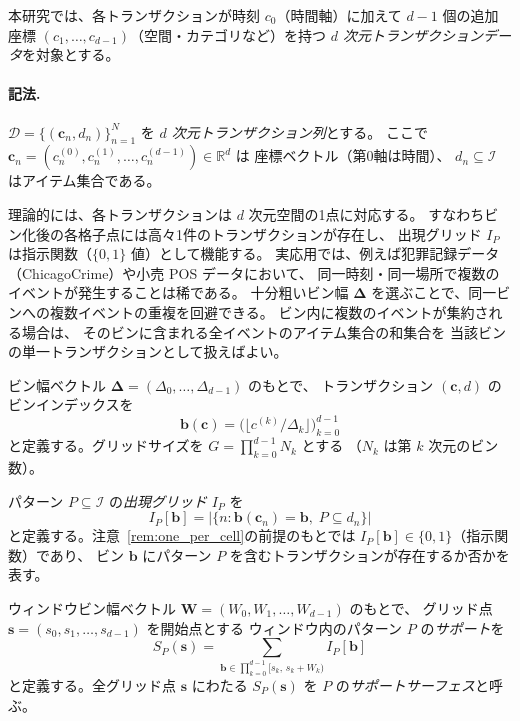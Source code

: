 本研究では、各トランザクションが時刻 $c_0$（時間軸）に加えて
$d-1$ 個の追加座標 $(c_1, \ldots, c_{d-1})$（空間・カテゴリなど）を持つ
\emph{$d$ 次元トランザクションデータ}を対象とする。

\paragraph{記法.}
$\mathcal{D} = \{(\bm{c}_n, d_n)\}_{n=1}^N$ を
\emph{$d$ 次元トランザクション列}とする。
ここで $\bm{c}_n = (c_n^{(0)}, c_n^{(1)}, \ldots, c_n^{(d-1)}) \in \mathbb{R}^d$ は
座標ベクトル（第0軸は時間）、
$d_n \subseteq \mathcal{I}$ はアイテム集合である。

\begin{remark}[データモデルの前提]\label{rem:one_per_cell}
理論的には、各トランザクションは $d$ 次元空間の1点に対応する。
すなわちビン化後の各格子点には高々1件のトランザクションが存在し、
出現グリッド $I_P$ は指示関数（$\{0,1\}$ 値）として機能する。
実応用では、例えば犯罪記録データ（ChicagoCrime）や小売 POS データにおいて、
同一時刻・同一場所で複数のイベントが発生することは稀である。
十分粗いビン幅 $\bm{\Delta}$ を選ぶことで、同一ビンへの複数イベントの重複を回避できる。
ビン内に複数のイベントが集約される場合は、
そのビンに含まれる全イベントのアイテム集合の和集合を
当該ビンの単一トランザクションとして扱えばよい。
\end{remark}

\begin{definition}[$d$ 次元ビンインデックス]\label{def:bin_nd}
ビン幅ベクトル $\bm{\Delta} = (\Delta_0, \ldots, \Delta_{d-1})$ のもとで、
トランザクション $(\bm{c}, d)$ のビンインデックスを
\[
  \bm{b}(\bm{c}) = \bigl(\lfloor c^{(k)} / \Delta_k \rfloor\bigr)_{k=0}^{d-1}
\]
と定義する。グリッドサイズを $G = \prod_{k=0}^{d-1} N_k$ とする
（$N_k$ は第 $k$ 次元のビン数）。
\end{definition}

\begin{definition}[$d$ 次元アイテム出現グリッド]\label{def:item_grid_nd}
パターン $P \subseteq \mathcal{I}$ の\emph{出現グリッド} $I_P$ を
\[
  I_P[\bm{b}]
  = \bigl|\{n : \bm{b}(\bm{c}_n) = \bm{b},\; P \subseteq d_n\}\bigr|
\]
と定義する。注意~\ref{rem:one_per_cell}の前提のもとでは
$I_P[\bm{b}] \in \{0, 1\}$（指示関数）であり、
ビン $\bm{b}$ にパターン $P$ を含むトランザクションが存在するか否かを表す。
\end{definition}

\begin{definition}[$d$ 次元スライディングウィンドウサポート]\label{def:support_nd}
ウィンドウビン幅ベクトル $\bm{W} = (W_0, W_1, \ldots, W_{d-1})$ のもとで、
グリッド点 $\bm{s} = (s_0, s_1, \ldots, s_{d-1})$ を開始点とする
ウィンドウ内のパターン $P$ の\emph{サポート}を
\begin{equation}\label{eq:support_nd}
  S_P(\bm{s})
  = \sum_{\bm{b} \in \prod_{k=0}^{d-1} [s_k,\, s_k + W_k)}
    I_P[\bm{b}]
\end{equation}
と定義する。全グリッド点 $\bm{s}$ にわたる $S_P(\bm{s})$ を
$P$ の\emph{サポートサーフェス}と呼ぶ。
\end{definition}

